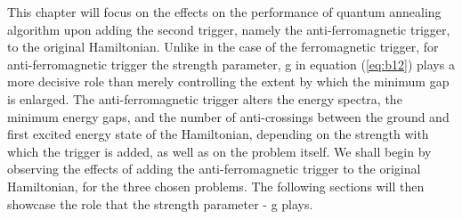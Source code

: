 \documentclass[../main.tex]{subfiles}
\begin{document}
This chapter will focus on the effects on the performance of quantum annealing algorithm upon adding the second trigger, namely the anti-ferromagnetic trigger, to the original Hamiltonian. Unlike in the case of the ferromagnetic trigger, for anti-ferromagnetic trigger the strength parameter, g in equation (\ref{eq:b12}) plays a more decisive role than merely controlling the extent by which the minimum gap is enlarged. The anti-ferromagnetic trigger alters the energy spectra, the minimum energy gaps, and the number of anti-crossings between the ground and first excited energy state of the Hamiltonian, depending on the strength with which the trigger is added, as well as on the problem itself. We shall begin by observing the effects of adding the anti-ferromagnetic trigger to the original Hamiltonian, for the three chosen problems. The following sections will then showcase the role that the strength parameter - g plays.
\end{document}
